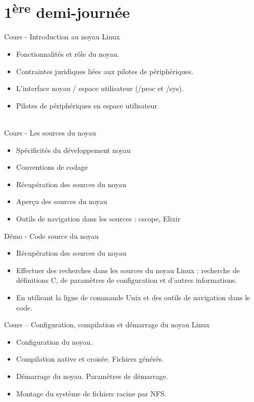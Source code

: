 \documentclass[a4paper,12pt,obeyspaces,spaces,hyphens]{article}
\begin{document}
\section{1\textsuperscript{ère} demi-journée}

\feagendaonecolumn
{Cours - Introduction au noyau Linux}
{
  \begin{itemize}
  \item Fonctionnalités et rôle du noyau.
  \item Contraintes juridiques liées aux pilotes de périphériques.
  \item L'interface noyau / espace utilisateur (/proc et /sys).
  \item Pilotes de périphériques en espace utilisateur.
  \end{itemize}
}
\\
\feagendatwocolumn
{Cours - Les sources du noyau}
{
  \begin{itemize}
  \item Spécificités du développement noyau
  \item Conventions de codage
  \item Récupération des sources du noyau
  \item Aperçu des sources du noyau
  \item Outils de navigation dans les sources : cscope, Elixir
  \end{itemize}
}
{Démo - Code source du noyau}
{
  \begin{itemize}
  \item Récupération des sources du noyau
  \item Effectuer des recherches dans les sources du noyau Linux :
    recherche de définitions C, de paramètres de configuration et d'autres
    informations.
  \item En utilisant la ligne de commande Unix et des outils de
    navigation dans le code.
 \end{itemize}
}

\feagendaonecolumn
{Cours – Configuration, compilation et démarrage du noyau Linux}
{
  \begin{itemize}
  \item Configuration du noyau.
  \item Compilation native et croisée. Fichiers générés.
  \item Démarrage du noyau. Paramètres de démarrage.
  \item Montage du système de fichiers racine par NFS.
  \end{itemize}
}
\end{document}
